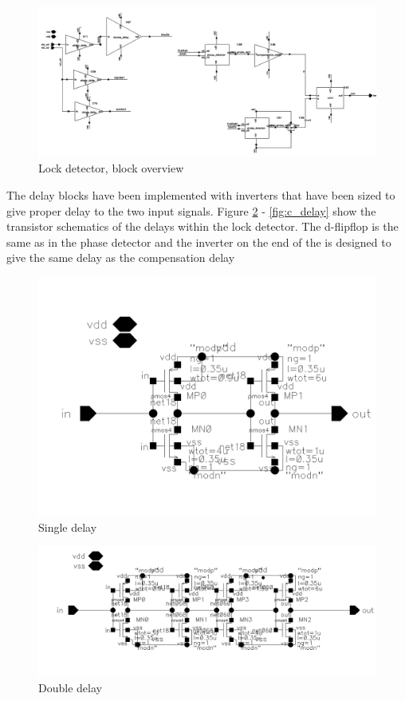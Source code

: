 \documentclass[a4paper,12pt]{article} \usepackage{graphicx}
\begin{document}
\begin{figure}[h]
        \centering
        \includegraphics[width=150mm]{../Bilder/LD_tran/LockDetector.png}
        \caption{Lock detector, block overview}
        \label{fig:LD_block}
\end{figure}


The delay blocks have been implemented with inverters that have been
sized to give proper delay to the two input signals. Figure
\ref{fig:s_delay} - \ref{fig:c_delay} show the transistor schematics of the
delays within the lock detector. The d-flipflop is the same as in the
phase detector and the inverter on the end of the is designed to give
the same delay as the compensation delay

\begin{figure}[h]
        \centering
        \includegraphics[width=150mm]{../Bilder/LD_tran/single_delay.png}
        \caption{Single delay}
        \label{fig:s_delay}
\end{figure}

\begin{figure}[h]
        \centering
        \includegraphics[width=150mm]{../Bilder/LD_tran/double_delay.png}
        \caption{Double delay}
        \label{fig:d_delay}
\end{figure}
\end{document}
